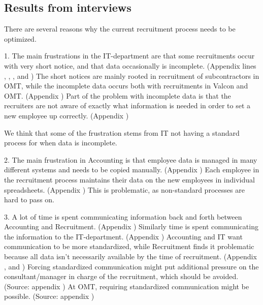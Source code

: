 \subsection{Results from interviews}
There are several reasons why the current recruitment process needs to be optimized.

1. The main frustrations in the IT-department are that some recruitments occur with very short notice, and that data occasionally is incomplete.
(Appendix  lines , , , and )
The short notices are mainly rooted in recruitment of subcontractors in OMT, while the incomplete data occurs both with recruitments in Valcon and OMT.
(Appendix )
Part of the problem with incomplete data is that the recruiters are not aware of exactly what information is needed in order to set a new employee up correctly.
(Appendix )

We think that some of the frustration stems from IT not having a standard process for when data is incomplete.

2. The main frustration in Accounting is that employee data is managed in many different systems and needs to be copied manually.
(Appendix )
Each employee in the recruitment process maintains their data on the new employees in individual spreadsheets.
(Appendix )
This is problematic, as non-standard processes are hard to pass on.

3. A lot of time is spent communicating information back and forth between Accounting and Recruitment.
(Appendix )
Similarly time is spent communicating the information to the IT-department.
(Appendix )
Accounting and IT want communication to be more standardized, while Recruitment finds it problematic because all data isn't necessarily available by the time of recruitment.
(Appendix ,  and )
Forcing standardized communication might put additional pressure on the consultant/manager in charge of the recruitment, which should be avoided.
(Source: appendix )
At OMT, requiring standardized communication might be possible.
(Source: appendix )

